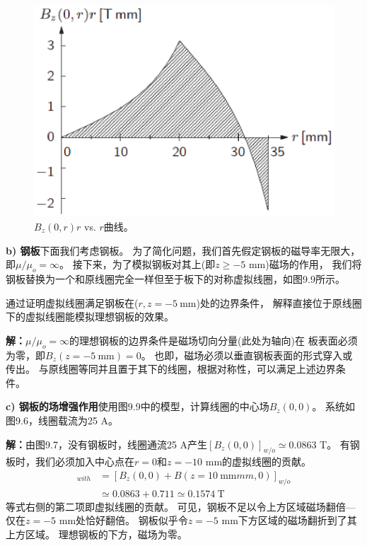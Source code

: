 \begin{figure}
	\centering
	\includegraphics[scale=0.6]{chpt9/figs/fig9.8.eps}
	\caption{$B_z(0,r)r$ vs. $r$曲线。}
\end{figure}

\textbf{b) 钢板}\qquad 下面我们考虑钢板。
为了简化问题，我们首先假定钢板的磁导率无限大，即$\mu/\mu_o=\infty$。
接下来，为了模拟钢板对其上(即$z\ge -5$ mm)磁场的作用，
我们将钢板替换为一个和原线圈完全一样但至于板下的对称虚拟线圈，如图9.9所示。

通过证明虚拟线圈满足钢板在($r,z=-5\ \mathrm{mm}$)处的边界条件，
解释直接位于原线圈下的虚拟线圈能模拟理想钢板的效果。

\textbf{解：}$\mu/\mu_o=\infty$的理想钢板的边界条件是磁场切向分量(此处为轴向)在
板表面必须为零，即$B_z(z=-5\ \mathrm{mm})=0$。
也即，磁场必须以垂直钢板表面的形式穿入或传出。
与原线圈等同并且置于其下的线圈，根据对称性，可以满足上述边界条件。

\textbf{c) 钢板的场增强作用}\qquad 使用图9.9中的模型，计算线圈的中心场$B_z(0,0)$。
系统如图9.6，线圈载流为25 A。

\textbf{解：}由图9.7，没有钢板时，线圈通流25 A产生$[B_z(0,0)]_{w/o}\simeq 0.0863$ T。
有钢板时，我们必须加入中心点在$r=0$和$z=-10$ mm的虚拟线圈的贡献。
\begin{align*}%
[B_{z}(0,0)]_{with}&=[B_{z}(0,0)+B(z=10\ \mathrm{mm}mm,0)]_{w/o}\\
&\simeq 0.0863+0.711\simeq 0.1574\ \mathrm{T}
\end{align*}
等式右侧的第二项即虚拟线圈的贡献。
可见，钢板不足以令上方区域磁场翻倍---仅在$z=-5$ mm处恰好翻倍。
钢板似乎令$z=-5$ mm下方区域的磁场翻折到了其上方区域。
理想钢板的下方，磁场为零。

